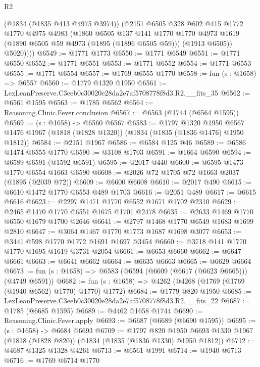 \begin{lexlean}{R2}
\begin{coremodule}
          (@1834 (@1835 @413 @4975 @3974))
          (@2151
            @6505
            @328
            @602
            @415
            @1772
            @1770
            @4975
            @4983
            (@1860
              @6505
              @137
              @141
              @1770
              @1770
              @4973
              @1619
              (@1890 @6505 @59 @4973 (@1895 (@1896 @6505 @59)))
              (@1913 @6505))
            @5020))))
@6549 := @1771 @1773
@6550 := @1771 @6549
@6551 := @1771 @6550
@6552 := @1771 @6551
@6553 := @1771 @6552
@6554 := @1771 @6553
@6555 := @1771 @6554
@6557 := @1769 @6555 @1770
@6558 := fun (s : @1658) => @6557
@6560 := @1779 @1320 @1950
@6561 := LexLeanPreserve.C3eeb0c30020e28da2e7af5708778f8d3.R2.__fits_35
@6562 := @6561 @1595
@6563 := @1785 @6562
@6564 := Reasoning.Clinic.Fever.conclusion
@6567 := @6563 (@1744 (@6564 @1595))
@6569 := (s : @1658) -> @6560 @6567
@6583 := @1797
    @1320
    @1950
    @6567
    @1476
    @1967
    (@1818 (@1828 @1320))
    (@1834 (@1835 (@1836 @1476) @1950 @1812))
@6584 := @2151 @1967
@6586 := @6584 @125 @46
@6589 := @6586 @1474 @6555 @1770
@6590 := @3108 @1703
@6591 := @1664 @6590
@6594 := @6589 @6591 (@1592 @6591)
@6595 := @2017 @440
@6600 := @6595 @1473 @1770 @6554 @1663 @6590
@6608 := @2026 @72 @1705 @72 @1663 @2037 (@1895 (@2039 @72))
@6609 := @6600 @6608
@6610 := @2017 @490
@6615 := @6610 @1472 @1770 @6553 @489 @1703
@6616 := @2051 @489
@6617 := @6615 @6616
@6623 := @2297 @1471 @1770 @6552 @1671 @1702 @2310
@6629 := @2465 @1470 @1770 @6551 @1675 @1701 @2478
@6635 := @2633 @1469 @1770 @6550 @1679 @1700 @2646
@6641 := @2797 @1468 @1770 @6549 @1683 @1699 @2810
@6647 := @3064 @1467 @1770 @1773 @1687 @1698 @3077
@6653 := @3441 @598 @1770 @1772 @1691 @1697 @3454
@6660 := @3718 @141 @1770 @1770 @1695 @1619 @3731 @2054
@6661 := @6653 @6660
@6662 := @6647 @6661
@6663 := @6641 @6662
@6664 := @6635 @6663
@6665 := @6629 @6664
@6673 := fun (s : @1658) => @6583 (@6594 (@6609 (@6617 (@6623 @6665))) (@4749 @6591))
@6682 := fun (s : @1658) => @4262 (@4268 (@1769 (@1769 (@1940 @6562) @1770) @1770) @1772)
@6684 := @1779 @820 @1950
@6685 := LexLeanPreserve.C3eeb0c30020e28da2e7af5708778f8d3.R2.__fits_22
@6687 := @1785 (@6685 @1595)
@6689 := @4462 @1658 @1744
@6690 := Reasoning.Clinic.Fever.apply
@6693 := @6687 (@6689 (@6690 @1595))
@6695 := (s : @1658) -> @6684 @6693
@6709 := @1797
    @820
    @1950
    @6693
    @1330
    @1967
    (@1818 (@1828 @820))
    (@1834 (@1835 (@1836 @1330) @1950 @1812))
@6712 := @4687 @1325 @1328 @4261
@6713 := @6561 @1991
@6714 := @1940 @6713
@6716 := @1769 @6714 @1770

\end{coremodule}
\end{lexlean}
